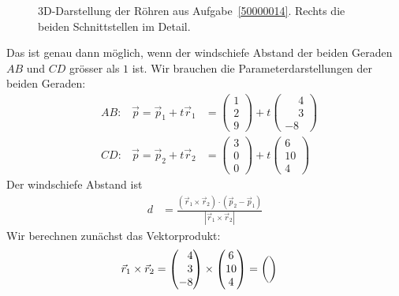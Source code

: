 \begin{loesung}
\begin{figure}
\caption{3D-Darstellung der Röhren aus Aufgabe~\ref{50000014}.
Rechts die beiden Schnittstellen im Detail.
\label{50000014:tubes}}
\end{figure}
Das ist genau dann möglich, wenn der windschiefe Abstand der beiden
Geraden $AB$ und $CD$ grösser als $1$ ist.
Wir brauchen die Parameterdarstellungen der beiden Geraden:
\[
\begin{aligned}
&AB:&\vec{p}=\vec{p}_1+t\vec{r}_1
&=
\begin{pmatrix}1\\2\\9\end{pmatrix} + t\begin{pmatrix}\phantom{-}4\\\phantom{-}3\\-8\end{pmatrix}
\\
&CD:&\vec{p}=\vec{p}_2+t\vec{r}_2
&=
\begin{pmatrix}3\\0\\0\end{pmatrix} + t\begin{pmatrix}6\\10\\4\end{pmatrix}
\end{aligned}
\]
Der windschiefe Abstand ist
\begin{align*}
d
&=
\frac{(\vec{r}_1\times\vec{r}_2)\cdot (\vec{p}_2 - \vec{p}_1)}{|\vec{r}_1\times \vec{r}_2|}
\end{align*}
Wir berechnen zunächst das Vektorprodukt:
\begin{align*}
\vec{r}_1\times \vec{r}_2
&=
\begin{pmatrix}\phantom{-}4\\\phantom{-}3\\-8\end{pmatrix}
\times
\begin{pmatrix}6\\10\\4\end{pmatrix}
=
{\def\arraystretch{2.2}
\begin{pmatrix}
{\def\arraystretch{1.0}
}
\end{pmatrix}}
\end{align*}
\end{loesung}
